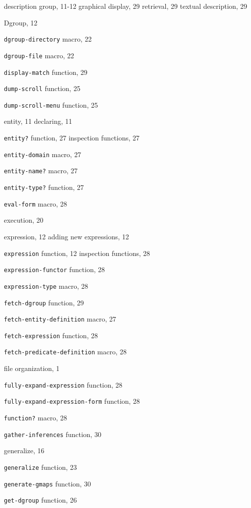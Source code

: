 \begin{theindex}
\item description group, 11-12
	\subitem  graphical display, 29
	\subitem  retrieval, 29
	\subitem  textual description, 29
\item Dgroup, 12
\item {\tt dgroup-directory} macro, 22
\item {\tt dgroup-file} macro, 22
\item {\tt display-match} function, 29
\item {\tt dump-scroll} function, 25
\item {\tt dump-scroll-menu} function, 25
\indexspace
\item entity, 11
	\subitem  declaring, 11
\item {\tt entity?} function, 27
	\subitem  inspection functions, 27
\item {\tt entity-domain} macro, 27
\item {\tt entity-name?} macro, 27
\item {\tt entity-type?} function, 27
\item {\tt eval-form} macro, 28
\item execution, 20
\item expression, 12
	\subitem  adding new expressions, 12
\item {\tt expression} function, 12
	\subitem  inspection functions, 28
\item {\tt expression-functor} function, 28
\item {\tt expression-type} macro, 28
\indexspace
\item {\tt fetch-dgroup} function, 29
\item {\tt fetch-entity-definition} macro, 27
\item {\tt fetch-expression} function, 28
\item {\tt fetch-predicate-definition} macro, 28
\item file organization, 1
\item {\tt fully-expand-expression} function, 28
\item {\tt fully-expand-expression-form} function, 28
\item {\tt function?} macro, 28
\indexspace
\item {\tt gather-inferences} function, 30
\item generalize, 16
\item {\tt generalize} function, 23
\item {\tt generate-gmaps} function, 30
\item {\tt get-dgroup} function, 26

\end{theindex}
